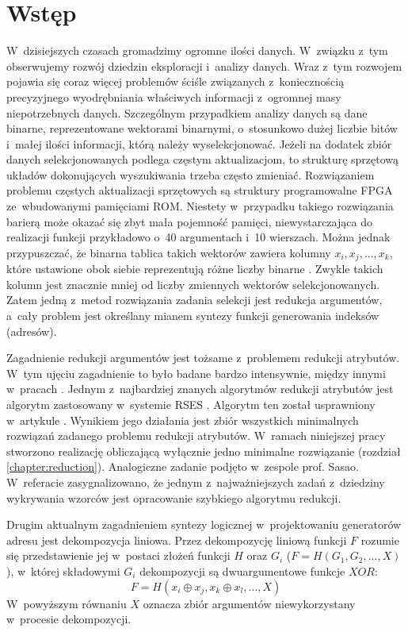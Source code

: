 \chapter{Wstęp}

W~dzisiejszych czasach gromadzimy ogromne ilości danych.
W~związku z~tym obserwujemy rozwój dziedzin eksploracji i~analizy danych.
Wraz z~tym rozwojem pojawia się coraz więcej problemów ściśle związanych z~koniecznością precyzyjnego wyodrębniania właściwych informacji z~ogromnej masy niepotrzebnych danych.
Szczególnym przypadkiem analizy danych są dane binarne, reprezentowane wektorami binarnymi, o~stosunkowo dużej liczbie bitów i~małej ilości informacji,
którą należy wyselekcjonować.
Jeżeli na dodatek zbiór danych selekcjonowanych podlega częstym aktualizacjom,
to strukturę sprzętową układów dokonujących wyszukiwania trzeba często zmieniać.
Rozwiązaniem problemu częstych aktualizacji sprzętowych są struktury programowalne FPGA ze~wbudowanymi pamięciami ROM.
Niestety w~przypadku takiego rozwiązania barierą może okazać się zbyt mała pojemność pamięci,
niewystarczająca do realizacji funkcji przykładowo o~40 argumentach i~10 wierszach.
Można jednak przypuszczać, że binarna tablica takich wektorów zawiera kolumny $x_i, x_j, ..., x_k$,
które ustawione obok siebie reprezentują różne liczby binarne \cite{sasao-workshop}.
Zwykle takich kolumn jest znacznie mniej od liczby zmiennych wektorów selekcjonowanych.
Zatem jedną z~metod rozwiązania zadania selekcji jest redukcja argumentów,
a~cały problem jest określany mianem syntezy funkcji generowania indeksów (adresów).

Zagadnienie redukcji argumentów jest tożsame z~problemem redukcji atrybutów.
W~tym ujęciu zagadnienie to było badane bardzo intensywnie, między innymi w~pracach \cite{fast-algorithm, efektywna-procedura, new-reduction, steinbach-posthoff, skowron-rauszer, slezak, novel-method}.
Jednym z~najbardziej znanych algorytmów redukcji atrybutów jest algorytm zastosowany w~systemie RSES \cite{rses}.
Algorytm ten został usprawniony w~artykule \cite{efektywna-procedura}.
Wynikiem jego działania jest zbiór wszystkich minimalnych rozwiązań zadanego problemu redukcji atrybutów.
W~ramach niniejszej pracy stworzono realizację obliczającą wyłącznie jedno minimalne rozwiązanie (rozdział \ref{chapter:reduction}).
Analogiczne zadanie podjęto w~zespole prof. Sasao.
W~referacie \cite{sasao-workshop} zasygnalizowano,
że jednym z~najważniejszych zadań z~dziedziny wykrywania wzorców jest opracowanie szybkiego algorytmu redukcji.

Drugim aktualnym zagadnieniem syntezy logicznej w~projektowaniu generatorów adresu jest dekompozycja liniowa.
Przez dekompozycję liniową funkcji $F$ rozumie się przedstawienie jej w~postaci złożeń funkcji $H$ oraz $G_i$ ($F = H(G_1, G_2, ...,  X)$),
w~której składowymi $G_i$ dekompozycji są dwuargumentowe funkcje $XOR$:
\begin{equation}
F = H (x_i \oplus x_j, x_k \oplus x_l, ..., X)
\end{equation}
W~powyższym równaniu $X$ oznacza zbiór argumentów niewykorzystany w~procesie dekompozycji.

